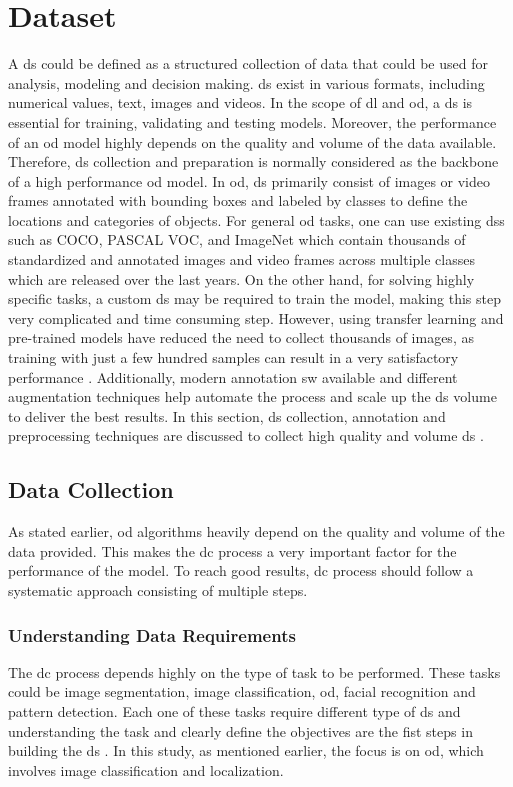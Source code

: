 \section{Dataset}
A \gls{ds} could be defined as a structured collection of data that could be used for analysis, modeling and decision making. \gls{ds} exist in various formats, including numerical values, text, images and videos. In the scope of \gls{dl} and \gls{od}, a \gls{ds} is essential for training, validating and testing models. Moreover, the performance of an \gls{od} model highly depends on the quality and volume of the data available. Therefore, \gls{ds} collection and preparation is normally considered as the backbone of a high performance \gls{od} model. In \gls{od}, \gls{ds} primarily consist of images or video frames annotated with bounding boxes and labeled by classes to define the locations and categories of objects. For general \gls{od} tasks, one can use existing \gls{ds}s such as COCO, PASCAL VOC, and ImageNet which contain thousands of standardized and annotated images and video frames across multiple classes which are released over the last years. On the other hand, for solving highly specific tasks, a custom \gls{ds} may be required to train the model, making this step very complicated and time consuming step. However, using transfer learning and pre-trained models have reduced the need to collect thousands of images, as training with just a few hundred samples can result in a very satisfactory performance \cite{IBM_Transfer_Learning}. Additionally, modern annotation \gls{sw} available and different augmentation techniques help automate the process and scale up the \gls{ds} volume to deliver the best results. In this section, \gls{ds} collection, annotation and preprocessing techniques are discussed to collect high quality and volume \gls{ds} \cite{oD_Review}.

\subsection{Data Collection}
As stated earlier, \gls{od} algorithms heavily depend on the quality and volume of the data provided. This makes the \gls{dc} process a very important factor for the performance of the model. To reach good results, \gls{dc} process should follow a systematic approach consisting of multiple steps.

\subsubsection{Understanding Data Requirements}
The \gls{dc} process depends highly on the type of task to be performed. These tasks could be image segmentation, image classification, \gls{od}, facial recognition and pattern detection. Each one of these tasks require different type of \gls{ds} and understanding the task and clearly define the objectives are the fist steps in building the \gls{ds} \cite{AIMultiple_Computer_Vision_Training_Data}. In this study, as mentioned earlier, the focus is on \gls{od}, which involves image classification and localization.

